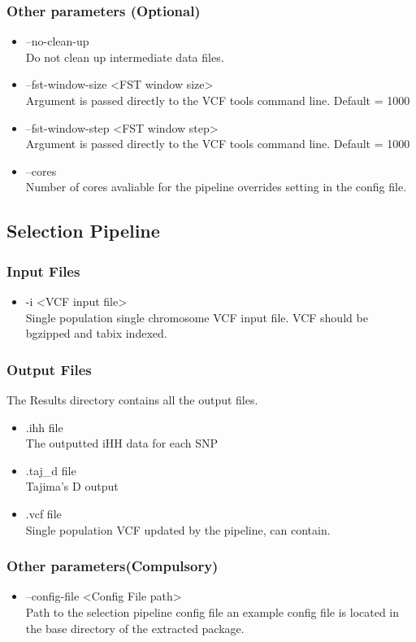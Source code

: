 \subsubsection{Other parameters (Optional)}
\begin{itemize}
\item --no-clean-up\\ 
Do not clean up intermediate data files.
\item --fst-window-size <FST window size>\\
Argument is passed directly to the VCF tools command line. Default = 1000
\item --fst-window-step <FST window step>\\
Argument is passed directly to the VCF tools command line. Default = 1000
\item --cores \\
Number of cores avaliable for the pipeline overrides setting in the config file.
\end{itemize}
\subsection{Selection Pipeline}
\subsubsection{Input Files}
\begin{itemize}
\item -i <VCF input file>\\
Single population single chromosome VCF input file. VCF should be bgzipped and tabix indexed.
\end{itemize}
\subsubsection{Output Files}
The Results directory contains all the output files.
\begin{itemize}
\item .ihh file\\
The outputted iHH data for each SNP
\item .taj\_d file\\
Tajima's D output
\item .vcf file\\
Single population VCF updated by the pipeline, can contain.
\end{itemize}
\subsubsection{Other parameters(Compulsory)}
\begin{itemize}
\item --config-file <Config File path>\\
Path to the selection pipeline config file an example config file is located in the base directory of the extracted package.
\end{itemize}
